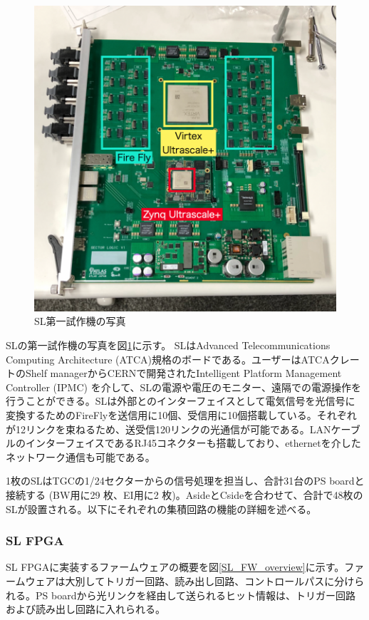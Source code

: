 \begin{figure} 
    \centering
    \includegraphics[width=16cm]{fig/Intro/TGC_SL.jpg}
    \caption[SL第一試作機の写真]{SL第一試作機の写真}
    \label{TGC_SL}
\end{figure}

SLの第一試作機の写真を図\ref{TGC_SL}に示す。
SLはAdvanced Telecommunications Computing Architecture (ATCA)規格のボードである。ユーザーはATCAクレートのShelf managerからCERNで開発されたIntelligent Platform Management Controller  (IPMC) を介して、SLの電源や電圧のモニター、遠隔での電源操作を行うことができる。SLは外部とのインターフェイスとして電気信号を光信号に変換するためのFireFlyを送信用に10個、受信用に10個搭載している。それぞれが12リンクを束ねるため、送受信120リンクの光通信が可能である。LANケーブルのインターフェイスであるRJ45コネクターも搭載しており、ethernetを介したネットワーク通信も可能である。

1枚のSLはTGCの1/24セクターからの信号処理を担当し、合計31台のPS boardと接続する (BW用に29 枚、EI用に2 枚)。AsideとCsideを合わせて、合計で48枚のSLが設置される。以下にそれぞれの集積回路の機能の詳細を述べる。

    \subsubsection{SL FPGA}
SL FPGAに実装するファームウェアの概要を図\ref{SL_FW_overview}に示す。ファームウェアは大別してトリガー回路、読み出し回路、コントロールパスに分けられる。PS boardから光リンクを経由して送られるヒット情報は、トリガー回路および読み出し回路に入れられる。

